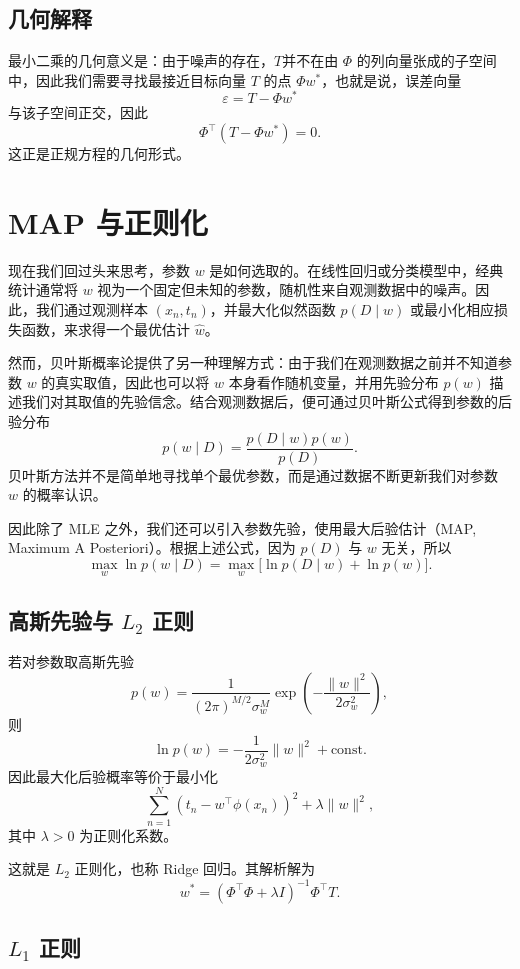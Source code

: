 \subsection{几何解释}

最小二乘的几何意义是：由于噪声的存在，\(T\)并不在由 $\Phi$ 的列向量张成的子空间中，因此我们需要寻找最接近目标向量 $T$ 的点 $\Phi w^*$，也就是说，误差向量
\[
\varepsilon = T-\Phi w^*
\]
与该子空间正交，因此
\[
\Phi^{\top}(T-\Phi w^*)=0.
\]
这正是正规方程的几何形式。

\section{MAP 与正则化}

现在我们回过头来思考，参数 \(w\) 是如何选取的。在线性回归或分类模型中，经典统计通常将 \(w\) 视为一个固定但未知的参数，随机性来自观测数据中的噪声。因此，我们通过观测样本 \((x_n,t_n)\)，并最大化似然函数 \(p(D\mid w)\) 或最小化相应损失函数，来求得一个最优估计 \(\hat w\)。

然而，贝叶斯概率论提供了另一种理解方式：由于我们在观测数据之前并不知道参数 \(w\) 的真实取值，因此也可以将 \(w\) 本身看作随机变量，并用先验分布 \(p(w)\) 描述我们对其取值的先验信念。结合观测数据后，便可通过贝叶斯公式得到参数的后验分布
\[
p(w\mid D)=\frac{p(D\mid w)p(w)}{p(D)}.
\]
贝叶斯方法并不是简单地寻找单个最优参数，而是通过数据不断更新我们对参数 \(w\) 的概率认识。

因此除了 MLE 之外，我们还可以引入参数先验，使用最大后验估计（MAP, Maximum A Posteriori）。根据上述公式，因为 $p(D)$ 与 $w$ 无关，所以
\[
\max_w \ln p(w\mid D)
=
\max_w \bigl[\ln p(D\mid w)+\ln p(w)\bigr].
\]

\subsection{高斯先验与 $L_2$ 正则}

若对参数取高斯先验
\[
p(w)
=
\frac{1}{(2\pi)^{M/2}\sigma_w^M}
\exp\!\left(
-\frac{\|w\|^2}{2\sigma_w^2}
\right),
\]
则
\[
\ln p(w)
=
-\frac{1}{2\sigma_w^2}\|w\|^2 + \text{const}.
\]
因此最大化后验概率等价于最小化
\[
\sum_{n=1}^N (t_n-w^{\top}\phi(x_n))^2
+
\lambda \|w\|^2,
\]
其中 $\lambda>0$ 为正则化系数。

这就是 $L_2$ 正则化，也称 Ridge 回归。其解析解为
\[
w^{*}
=
(\Phi^{\top}\Phi+\lambda I)^{-1}\Phi^{\top}T.
\]

\subsection{$L_1$ 正则}

